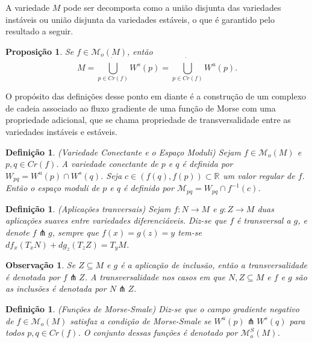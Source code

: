 \documentclass[12pt]{book}
\newtheorem{definicao}[teorema]{Definição}
\newtheorem{observacao}[teorema]{Observação}
\newtheorem{proposicao}[teorema]{Proposição}
\newcommand{\espacomoduli}[2]{\mathcal{M}_{#1#2}}
\newcommand{\espacotangenteponto}[2]{T_{#1}#2}
\newcommand{\funcoesmorse}[1]{\mathcal{M}_{o}(#1)}
\newcommand{\funcoesmorsesmale}[1]{\mathcal{M}^{S}_{o}(#1)}
\newcommand{\pontoscriticos}[1]{\textit{Cr}(#1)}
\newcommand{\real}[1]{\mathbb{R}^{#1}}
\newcommand{\reta}{\real{}}
\newcommand{\variedadeconectantepontos}[2]{W_{#1#2}}
\newcommand{\variedadeestavel}[1]{W^{s}(#1)}
\newcommand{\variedadeinstavel}[1]{W^{u}(#1)}
\begin{document}
	A variedade $M$ pode ser decomposta como a união disjunta das variedades instáveis ou união disjunta da variedades estáveis, o que é garantido pelo resultado a seguir.
	
	\begin{proposicao}\label{proposicao_uniao_variedade_instavel_estavel}
		Se $f \in \funcoesmorse{M}$, então
		$$
		M = \dot{\bigcup_{p \in \pontoscriticos{f}}}\variedadeestavel{p} = \dot{\bigcup_{p \in \pontoscriticos{f}}}\variedadeinstavel{p}.
		$$
	\end{proposicao}

	 O propósito das definições desse ponto em diante é a construção de um complexo de cadeia associado ao fluxo gradiente de uma função de Morse com uma propriedade adicional, que se chama propriedade de transversalidade entre as variedades instáveis e estáveis.
	 
	 \begin{definicao}
	 	(Variedade Conectante e o Espaço Moduli) Sejam $f \in \funcoesmorse{M}$ e $p,q \in \pontoscriticos{f}$. A variedade conectante de $p$ e $q$ é definida por $\variedadeconectantepontos{p}{q} = \variedadeinstavel{p}\cap \variedadeestavel{q}$. Seja $c \in (f(q), f(p)) \subset \reta$ um valor regular de $f$. Então o espaço moduli de $p$ e $q$ é definido por $\espacomoduli{p}{q} = \variedadeconectantepontos{p}{q}\cap f^{-1}(c)$.
	 \end{definicao}
	 
	 \begin{definicao}\label{definicao_aplicao_transversal}
	 	(Aplicações tranversais) Sejam $f: N\to M$ e $g: Z \to M$ duas aplicações suaves entre variedades diferenciáveis. Diz-se que $f$ é transversal a $g$, e denote $f \pitchfork g$, sempre que $f(x) = g(z) = y$ tem-se $df_{x}(\espacotangenteponto{x}{N}) + dg_{z}(\espacotangenteponto{z}{Z}) = \espacotangenteponto{y}{M} $.
	 \end{definicao}
	 
	 \begin{observacao}
	 	Se $Z \subseteq M$ e $g$ é a aplicação de inclusão, então a transversalidade é denotada por $f\pitchfork Z$. A transversalidade nos casos em que $N, Z \subseteq M$ e $f$ e $g$ são as inclusões é denotada por $N \pitchfork Z$.
	 \end{observacao}
	 
	 \begin{definicao}
	 	(Funções de Morse-Smale) Diz-se que o campo gradiente negativo de $f \in \funcoesmorse{M}$ satisfaz a condição de Morse-Smale se $\variedadeinstavel{p}\pitchfork \variedadeestavel{q}$ para todos $p,q \in \pontoscriticos{f}$. O conjunto dessas funções é denotado por $\funcoesmorsesmale{M}$.
	 \end{definicao}
	 
\end{document}
